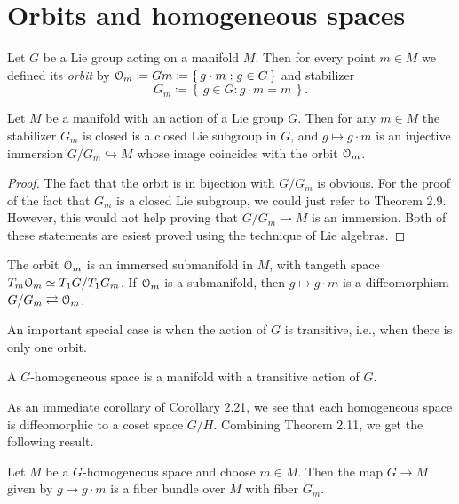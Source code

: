 \section{Orbits and homogeneous spaces}
Let $G$ be a Lie group acting on a manifold $M$. Then for every point
$m\in M$ we defined its \emph{orbit} by
$\mathcal{O}_m\coloneq Gm\coloneq\left\{\,g\cdot m:g\in G\,\right\}$ and
stabilizer
\[
G_m\coloneq\left\{\,g\in G:g\cdot m=m\,\right\}.
\]

\begin{theorem}
  Let $M$ be a manifold with an action of a Lie group $G$. Then for any
  $m\in M$ the stabilizer $G_m$ is closed is a closed Lie subgroup in $G$,
  and $g\mapsto g\cdot m$ is an injective immersion $G/G_m\hookrightarrow
  M$ whose image coincides with the orbit $\mathcal{O}_m$.
\end{theorem}

\begin{proof}
  The fact that the orbit is in bijection with $G/G_m$ is obvious. For the
  proof of the fact that $G_m$ is a closed Lie subgroup, we could just
  refer to Theorem 2.9. However, this would not help proving that
  $G/G_m\to M$ is an immersion. Both of these statements are esiest proved
  using the technique of Lie algebras.
\end{proof}

\begin{corollary}
  The orbit $\mathcal{O}_m$ is an immersed submanifold in $M$, with tangeth space
  $T_m\mathcal{O}_m\simeq T_1G/T_1G_m$. If $\mathcal{O}_m$ is a submanifold, then
  $g\mapsto g\cdot m$ is a diffeomorphism $G/G_m\rightleftarrows\mathcal{O}_m$.
\end{corollary}

An important special case is when the action of $G$ is transitive, i.e.,
when there is only one orbit.

\begin{definition}
  A $G$-homogeneous space is a manifold with a transitive action of $G$.
\end{definition}

As an immediate corollary of Corollary 2.21, we see that each homogeneous
space is diffeomorphic to a coset space $G/H$. Combining Theorem 2.11, we
get the following result.

\begin{corollary}
  Let $M$ be a $G$-homogeneous space and choose $m\in M$. Then the map
  $G\to M$ given by $g\mapsto g\cdot m$ is a fiber bundle over $M$ with
  fiber $G_m$.
\end{corollary}

